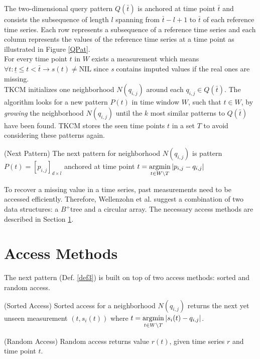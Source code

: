 \documentclass[abstracton,12pt,oneside]{scrreprt}
\begin{document}
The two-dimensional query pattern $Q(\bar{t})$ is anchored at time point $\bar{t}$ and consists the subsequence of length $l$ spanning from $\bar{t}-l+1$ to $\bar{t}$ of each reference time series. Each row represents a subsequence of a reference time series and each column represents the values of the reference time series at a time point as illustrated in Figure \ref{QPat}.\\ 
For every time point $t$ in $W$ exists a measurement which means $\forall t: \underline{t} \leq t < \bar{t} \rightarrow s(t) \ne \text{NIL}$ since \emph{s} contains imputed values if the real ones are missing. \\
TKCM  initializes one neighborhood $N(q_{i,j})$ around each $q_{i,j} \in Q(\bar{t})$. The algorithm looks for a new pattern $P(t)$ in time window $W$, such that $t \in W$, by \emph{growing} the neighborhood $N(q_{i,j})$ until the $k$ most similar patterns to $Q(\bar{t})$ have been found. TKCM stores the seen time points $t$ in a set $T$ to avoid considering these patterns again. 
\begin{defn}
		\label{def3}
	(Next Pattern) The next pattern for neighborhood $N(q_{i,j})$ is pattern $P(t) = [p_{i,j}]_{d\times l}$ anchored at time point $t = \argmin_{t \in W \setminus T} |p_{i,j}-q_{i,j}|$
\end{defn}
 To recover a missing value in a time series, past measurements need to be  accessed efficiently. Therefore, Wellenzohn et al.\cite{BScT} suggest a combination of two data structures: a $B^+$tree and a circular array. The necessary access methods are described in Section \ref{AccessMethods}.


\section{Access Methods}
\label{AccessMethods}
The next pattern (Def. \ref{def3}) is built on top of two access methods: sorted and random access. 


\begin{defn}
	\label{sorted}
	(Sorted Access) Sorted access for a neighborhood $N(q_{i,j})$ returns the next yet unseen measurement $(t, s_i(t))$ where $t = \argmin_{t \in W \setminus T} |s_i(t) - q_{i,j}|$.
\end{defn}
\begin{defn}
	\label{random}
	(Random Access) Random access returns value $r(t)$, given time series $r$ and time point $t$.	
\end{defn}
\end{document}
